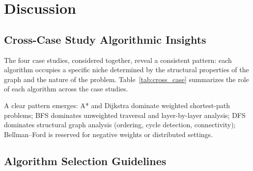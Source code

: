 \documentclass[12pt, a4paper, oneside]{report}
\theoremstyle{definition}
\begin{document}
\chapter{Discussion}

\section{Cross-Case Study Algorithmic Insights}

The four case studies, considered together, reveal a consistent pattern: each algorithm occupies a specific niche determined by the structural properties of the graph and the nature of the problem. Table~\ref{tab:cross_case} summarizes the role of each algorithm across the case studies.

\begin{table}[H]
\centering
\caption{Algorithm roles across all four case studies}
\label{tab:cross_case}
\end{table}

A clear pattern emerges: A* and Dijkstra dominate weighted shortest-path problems; BFS dominates unweighted traversal and layer-by-layer analysis; DFS dominates structural graph analysis (ordering, cycle detection, connectivity); Bellman–Ford is reserved for negative weights or distributed settings.

\section{Algorithm Selection Guidelines}
\end{document}
